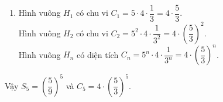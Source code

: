 \begin{bt}
{\begin{enumerate}
				\item Hình vuông $H_1$ có chu vi $C_1=5\cdot 4\cdot  \dfrac{1}{3}=4\cdot \dfrac{5}{3}$.\\
				Hình vuông $H_2$ có chu vi $C_2=5^2\cdot4\cdot \dfrac{1}{3^2}=4\cdot \left(\dfrac{5}{3}\right)^2$.\\
				Hình vuông $H_n$ có diện tích $C_n=5^n\cdot4\cdot  \dfrac{1}{3^n}=4\cdot \left(\dfrac{5}{3}\right)^n$.\\
				
			\end{enumerate}
			Vậy $S_5=\left(\dfrac{5}{9}\right)^5$ và $C_5=4\cdot \left(\dfrac{5}{3}\right)^5$.
		}
	\end{bt}
